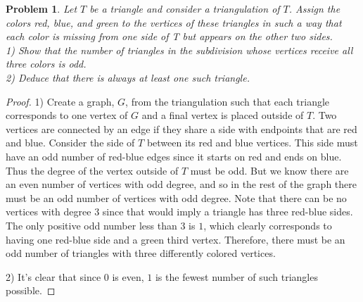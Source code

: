\documentclass{article}
\newtheorem{problem}{Problem}
\begin{document}
\begin{flushleft}
\begin{problem}
Let $T$ be a triangle and consider a triangulation of $T$. Assign the colors red, blue, and green to the vertices of these triangles in such a way that each color is missing from one side of T but appears on the other two sides.\\
1) Show that the number of triangles in the subdivision whose vertices receive all three colors is odd.\\
2) Deduce that there is always at least one such triangle.
\end{problem}
\begin{proof}
1) Create a graph, $G$, from the triangulation such that each triangle corresponds to one vertex of $G$ and a final vertex is placed outside of $T$. Two vertices are connected by an edge if they share a side with endpoints that are red and blue. Consider the side of $T$ between its red and blue vertices. This side must have an odd number of red-blue edges since it starts on red and ends on blue. Thus the degree of the vertex outside of $T$ must be odd. But we know there are an even number of vertices with odd degree, and so in the rest of the graph there must be an odd number of vertices with odd degree. Note that there can be no vertices with degree $3$ since that would imply a triangle has three red-blue sides. The only positive odd number less than $3$ is $1$, which clearly corresponds to having one red-blue side and a green third vertex. Therefore, there must be an odd number of triangles with three differently colored vertices.\newline

2) It's clear that since $0$ is even, $1$ is the fewest number of such triangles possible.
\end{proof}


\end{flushleft}
\end{document}
